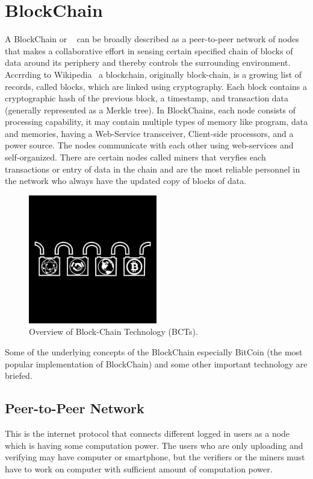 \section{BlockChain}
A BlockChain or \textbf{} ~\cite{the_truth_machine} can be broadly described as a peer-to-peer network of nodes that makes a collaborative effort in sensing certain specified chain of blocks of data around its periphery and thereby controls the surrounding environment.
Accrrding to Wikipedia~\cite{blockchain_wiki} a blockchain, originally block-chain, is a growing list of records, called blocks, which are linked using cryptography. Each block contains a cryptographic hash of the previous block, a timestamp, and transaction data (generally represented as a Merkle tree).
In BlockChains, each node consists of processing capability, it may contain multiple types of memory like program, data and memories, having a Web-Service transceiver, Client-side processors, and a power source. The nodes communicate with each other using web-services and self-organized.
There are certain nodes called miners that veryfies each transactions or entry of data in the chain and are the most reliable personnel in the network who always have the updated copy of blocks of data.

\begin{figure}
\begin{center}
\includegraphics[width=0.5\textwidth]{./img_src/blockchain.jpg}
\end{center}
\caption{Overview of Block-Chain Technology (BCTs).}
\end{figure}

Some of the underlying concepts of the BlockChain especially BitCoin (the most popular implementation of BlockChain) and some other important technology are briefed.

\subsection{Peer-to-Peer Network}
This is the internet protocol that connects different logged in users as a node which is having some computation power. The users who are only uploading and verifying may have computer or smartphone, but the verifiers or the miners must have to work on computer with sufficient amount of computation power.

